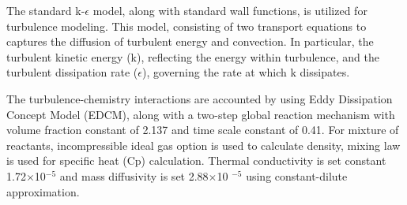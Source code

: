 The standard k-$\epsilon$ model, along with standard wall functions, is utilized for turbulence modeling. This model, consisting of two transport equations to captures the diffusion of turbulent energy and convection. In particular, the turbulent kinetic energy (k), reflecting the energy within turbulence, and the turbulent dissipation rate ($\epsilon$), governing the rate at which k dissipates.


 
The turbulence-chemistry interactions are accounted by using Eddy Dissipation Concept Model (EDCM), along with a two-step global reaction mechanism with volume fraction constant of 2.137 and time scale constant of 0.41. For mixture of reactants, incompressible ideal gas option is used to calculate density, mixing law is used for specific heat (Cp) calculation. Thermal conductivity is set constant 1.72$\times$10$^{-5}$ and mass diffusivity is set 2.88$\times$10 $^{-5}$ using constant-dilute approximation.


